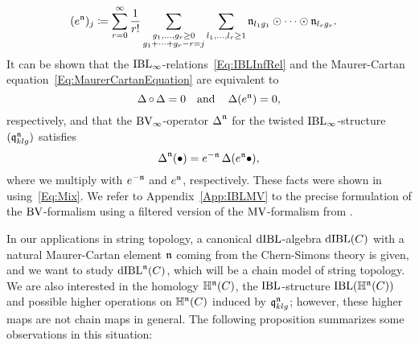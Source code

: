 \documentclass[\MainFolder/Text.tex]{subfiles}
\begin{document}
\begin{Remark}
\begin{RemarkList}
\begin{align*}
(e^{\mathfrak{n}})_j &\coloneqq \sum_{r=0}^\infty \frac{1}{r!} \sum_{\substack{g_1, \dotsc, g_r \ge 0 \\ g_1 + \dotsb +g_r - r= j }} \sum_{l_1, \dotsc, l_r\ge 1} \mathfrak{n}_{l_1 g_1} \odot \dotsb \odot \mathfrak{n}_{l_r g_r}.
\end{align*}
It can be shown that the $\mathrm{IBL}_\infty$-relations~\eqref{Eq:IBLInfRel} and the Maurer-Cartan equation~\eqref{Eq:MaurerCartanEquation} are equivalent to  
\begin{equation}\label{Eq:BVEquat}
 \operatorname{\Delta}\circ \operatorname{\Delta} = 0\quad\text{and}\quad \operatorname{\Delta}(e^{\mathfrak{n}}) = 0,
\end{equation}
respectively, and that the $\mathrm{BV}_\infty$-operator $\operatorname{\Delta}^{\mathfrak{n}}$ for the twisted $\mathrm{IBL}_\infty$-structure $(\mathfrak{q}_{klg}^{\mathfrak{n}})$ satisfies
\begin{equation} \label{Eq:TwistBV}
\operatorname{\Delta}^{\mathfrak{n}}(\bullet)= e^{-\mathfrak{n}}\operatorname{\Delta}(e^{\mathfrak{n}}\bullet),
\end{equation}
where we multiply with $e^{-\mathfrak{n}}$ and $e^{\mathfrak{n}}$, respectively.
These facts were shown in~\cite{Cieliebak2015} using~\eqref{Eq:Mix}.
We refer to Appendix~\ref{App:IBLMV} to the precise formulation of the $\mathrm{BV}$-formalism using a filtered version of the $\mathrm{MV}$-formalism from \cite{Markl2015}.\qedhere
\end{RemarkList}
\end{Remark}

In our applications in string topology, a canonical $\mathrm{dIBL}$-algebra $\mathrm{dIBL}(C)$ with a natural Maurer-Cartan element $\mathfrak{n}$ coming from the Chern-Simons theory is given, and we want to study $\mathrm{dIBL}^{\mathfrak{n}}(C)$, which will be a chain model of string topology.
We are also interested in the homology $\mathbb{H}^{\mathfrak{n}}(C)$, the $\mathrm{IBL}$-structure $\mathrm{IBL}(\mathbb{H}^{\mathfrak{n}}(C))$ and possible higher operations on $\mathbb{H}^{\mathfrak{n}}(C)$ induced by $\mathfrak{q}_{klg}^{\mathfrak{n}}$; however, these higher maps are not chain maps in general.
The following proposition summarizes some observations in this situation:
\end{document}
